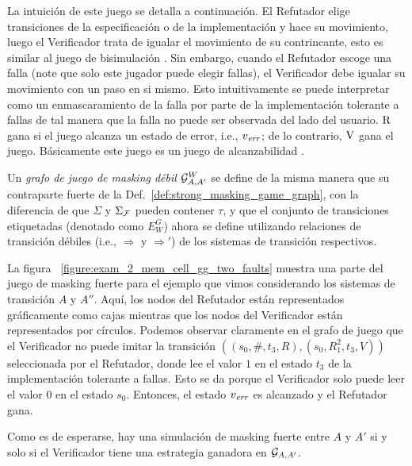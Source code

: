 La intuición de este juego se detalla a continuación. 
El Refutador elige transiciones de la especificación o de la implementación y hace su movimiento, luego el Verificador trata de igualar el movimiento de su contrincante, esto es similar al juego de bisimulación \cite{Stirling99}. 
Sin embargo, cuando el Refutador escoge una falla (note que solo este jugador puede elegir fallas), el Verificador debe igualar su movimiento con un paso en si mismo.
Esto intuitivamente se puede interpretar como un enmascaramiento de la falla por parte de la implementación tolerante a fallas de tal manera que la falla no puede ser observada del lado del usuario. $\mathrm{R}$ gana si el juego alcanza un estado de error, i.e., $v_{\mathit{err}}$; de lo contrario, $\mathrm{V}$ gana el juego. 
Básicamente este juego es un juego de alcanzabilidad \cite{Jurd11}.

Un \emph{grafo de juego de masking débil} $\mathcal{G}^W_{A,A'}$ se define de la misma manera que su contraparte fuerte de la 
Def.~\ref{def:strong_masking_game_graph}, con la diferencia de que
$\Sigma$ y $\Sigma_{\mathcal{F}}$ pueden contener $\tau$, y que el conjunto de transiciones etiquetadas (denotado como $E_W^G$) ahora se define utilizando relaciones de transición débiles (i.e., $\Rightarrow$ y $\Rightarrow'$) de los sistemas de transición respectivos.

La figura ~\ref{figure:exam_2_mem_cell_gg_two_faults} muestra una parte del juego de masking fuerte para el ejemplo que vimos considerando los sistemas de transición $A$ y $A''$. Aquí, los nodos del Refutador están representados gráficamente como cajas mientras que los nodos del Verificador están representados por círculos.
Podemos observar claramente en el grafo de juego que el Verificador no puede imitar la transición $((s_0, \#, t_3, R),(s_0, R_1^2, t_3, V))$
seleccionada por el Refutador, donde lee el valor $1$ en el estado $t_3$ de la implementación tolerante a fallas. Esto se da porque el Verificador solo puede leer el valor $0$ en el estado $s_0$. 
Entonces, el estado $v_{\mathit{err}}$ es alcanzado y el Refutador gana.

Como es de esperarse, hay una simulación de masking fuerte entre $A$ y $A'$
si y solo si el Verificador tiene una estrategia ganadora en $\mathcal{G}_{A, A'}$.

